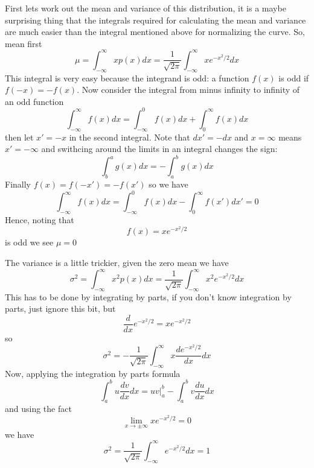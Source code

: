 
First lets work out the mean and variance of this distribution, it is
a maybe surprising thing that the integrals required for calculating
the mean and variance are much easier than the integral mentioned
above for normalizing the curve. So, mean first
\begin{equation}
\mu=\int_{-\infty}^\infty xp(x)dx =\frac{1}{\sqrt{2\pi}}\int_{-\infty}^\infty xe^{-x^2/2}dx
\end{equation}
This integral is very easy because the integrand is odd: a function $f(x)$ is odd if $f(-x)=-f(x)$. Now consider the integral from minus infinity to infinity of an odd function
\begin{equation}
\int_{-\infty}^\infty f(x)dx=\int_{-\infty}^0 f(x)dx+\int_0^\infty f(x)dx
\end{equation}
then let $x'=-x$ in the second integral. Note that $dx'=-dx$ and $x=\infty$ means $x'=-\infty$ and swithcing around the limits in an integral changes the sign:
\begin{equation}
\int_b^a g(x)dx=-\int_a^b g(x)dx
\end{equation}
Finally $f(x)=f(-x')=-f(x')$ so we have
\begin{equation}
\int_{-\infty}^\infty f(x)dx=\int_{-\infty}^0 f(x)dx-\int_0^{\infty} f(x')dx'=0
\end{equation}
Hence, noting that 
\begin{equation}
f(x)=xe^{-x^2/2}
\end{equation}
is odd we see $\mu=0$

The variance is a little trickier, given the zero mean we have
\begin{equation}
\sigma^2=\int_{-\infty}^\infty x^2p(x)dx =\frac{1}{\sqrt{2\pi}}\int_{-\infty}^\infty x^2e^{-x^2/2}dx
\end{equation}
This has to be done by integrating by parts, if you don't know integration by parts, just ignore this bit, but
\begin{equation}
\frac{d}{dx}e^{-x^2/2}=xe^{-x^2/2}
\end{equation}
so
\begin{equation}
\sigma^2=-\frac{1}{\sqrt{2\pi}}\int_{-\infty}^\infty x\frac{de^{-x^2/2}}{dx}dx
\end{equation}
Now, applying the integration by parts formula
\begin{equation}
\int_a^b u\frac{dv}{dx}dx=uv|_a^b-\int_a^b v\frac{du}{dx}dx
\end{equation}
and using the fact 
\begin{equation}
\lim_{x\rightarrow \pm \infty} xe^{-x^2/2}=0
\end{equation}
we have 
\begin{equation}
\sigma^2=\frac{1}{\sqrt{2\pi}}\int_{-\infty}^\infty e^{-x^2/2}dx=1
\end{equation}
